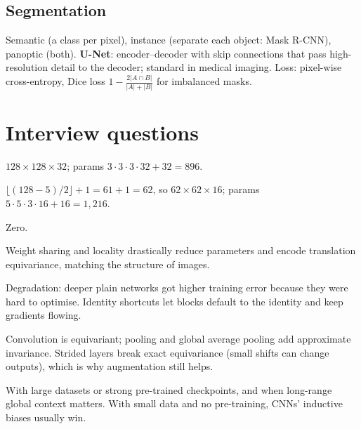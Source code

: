 \subsection{Segmentation}
Semantic (a class per pixel), instance (separate each object: Mask R-CNN), panoptic (both). \textbf{U-Net}: encoder--decoder with skip connections that pass high-resolution detail to the decoder; standard in medical imaging. Loss: pixel-wise cross-entropy, Dice loss $1-\frac{2|A\cap B|}{|A|+|B|}$ for imbalanced masks.

\section{Interview questions}
\A $128\times128\times32$; params $3\cdot3\cdot3\cdot32+32=896$.

\A $\lfloor(128-5)/2\rfloor+1=61+1=62$, so $62\times62\times16$; params $5\cdot5\cdot3\cdot16+16=1{,}216$.

\A Zero.

\A Weight sharing and locality drastically reduce parameters and encode translation equivariance, matching the structure of images.

\A Degradation: deeper plain networks got higher training error because they were hard to optimise. Identity shortcuts let blocks default to the identity and keep gradients flowing.

\A Convolution is equivariant; pooling and global average pooling add approximate invariance. Strided layers break exact equivariance (small shifts can change outputs), which is why augmentation still helps.

\A With large datasets or strong pre-trained checkpoints, and when long-range global context matters. With small data and no pre-training, CNNs' inductive biases usually win.
